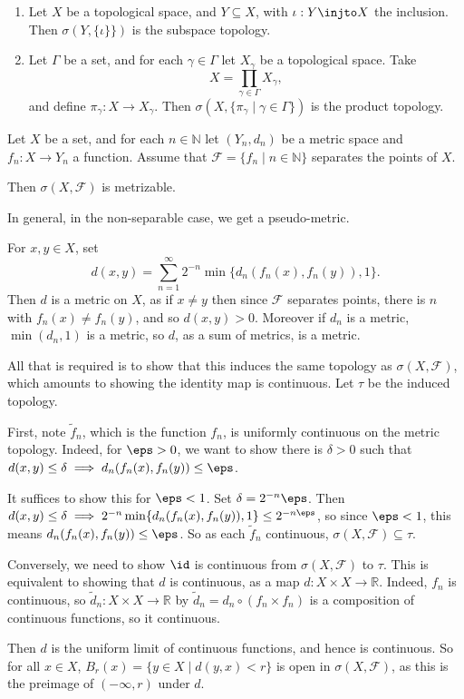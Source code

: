 \documentclass[12pt]{article}
\begin{document}
\begin{exbox}
	\begin{enumerate}
		\item Let $X$ be a topological space, and $Y \subseteq X$, with $\iota : Y \injto X$ the inclusion. Then $\sigma(Y, \{\iota \}\})$ is the subspace topology.
		\item Let $\Gamma$ be a set, and for each $\gamma \in \Gamma$ let $X_\gamma$ be a topological space. Take
			\[
			X = \prod_{\gamma \in \Gamma} X_\gamma,
			\]
			and define $\pi_\gamma : X \to X_\gamma$. Then $\sigma(X, \{\pi_\gamma \mid \gamma \in \Gamma\})$ is the product topology.
	\end{enumerate}
\end{exbox}

\begin{proposition}
	Let $X$ be a set, and for each $n \in \mathbb{N}$ let $(Y_n, d_n)$ be a metric space and $f_n : X \to Y_n$ a function. Assume that $\mathcal{F} = \{f_n \mid n \in \mathbb{N}\}$ separates the points of $X$.

	Then $\sigma(X, \mathcal{F})$ is metrizable.
\end{proposition}

In general, in the non-separable case, we get a pseudo-metric.


\begin{proofbox}
	For $x, y \in X$, set
	\[
		d(x, y) = \sum_{n=1}^{\infty} 2^{-n} \min \{d_n(f_n(x), f_n(y)), 1\}.
	\]
	Then $d$ is a metric on $X$, as if $x \neq y$ then since $\mathcal{F}$ separates points, there is $n$ with $f_n(x) \neq f_n(y)$, and so $d(x, y) > 0$. Moreover if $d_n$ is a metric, $\min(d_n, 1)$ is a metric, so $d$, as a sum of metrics, is a metric.

	All that is required is to show that this induces the same topology as $\sigma(X, \mathcal{F})$, which amounts to showing the identity map is continuous. Let $\tau$ be the induced topology.

	First, note $\tilde f_n$, which is the function $f_n$, is uniformly continuous on the metric topology. Indeed, for $\eps > 0$, we want to show there is $\delta > 0$ such that $d(x, y) \leq \delta \implies d_n(f_n(x), f_n(y)) \leq \eps$.

	It suffices to show this for $\eps < 1$. Set $\delta = 2^{-n} \eps$. Then $d(x, y) \leq \delta \implies 2^{-n} \min\{d_n(f_n(x), f_n(y)), 1\} \leq 2^{-n \eps}$, so since $\eps < 1$, this means $d_n(f_n(x), f_n(y)) \leq \eps$. So as each $\tilde f_n$ continuous, $\sigma(X, \mathcal{F}) \subseteq \tau$.

	Conversely, we need to show $\id$ is continuous from $\sigma(X, \mathcal{F})$ to $\tau$. This is equivalent to showing that $d$ is continuous, as a map $d : X \times X \to \mathbb{R}$. Indeed, $f_n$ is continuous, so $\tilde d_n : X \times X \to \mathbb{R}$ by $\tilde d_n = d_n \circ (f_n \times f_n)$ is a composition of continuous functions, so it continuous.

	Then $d$ is the uniform limit of continuous functions, and hence is continuous. So for all $x \in X$, $B_r(x) = \{y \in X \mid d(y, x) < r\}$ is open in $\sigma(X, \mathcal{F})$, as this is the preimage of $(-\infty, r)$ under $d$.
\end{proofbox}
\end{document}
